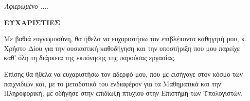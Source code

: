 \pagebreak
\thispagestyle{plain}
\vspace*{\fill}
\begin{flushright}
{\fontsize{14}{14}\selectfont
\textit{Αφιερωμένο ....}
}
\end{flushright}
\vspace*{\fill}

\pagebreak
\thispagestyle{plain}
\begin{center}
{\fontsize{16}{16}\selectfont \underline{\textbf{ΕΥΧΑΡΙΣΤΙΕΣ}}}
\end{center}
\vspace{1cm}

Με βαθιά ευγνωμοσύνη, θα ήθελα να ευχαριστήσω τον επιβλέποντα καθηγητή μου, κ. Χρήστο Δίου για την ουσιαστική καθοδήγηση και την υποστήριξη που μου παρείχε καθ' όλη τη διάρκεια της εκπόνησης της παρούσας εργασίας. 

Επίσης θα ήθελα να ευχαριστήσω τον αδερφό μου, που με εισήγαγε στον κόσμο των παιχνιδιών και, με το μεταδοτικό του ενδιαφέρον για τα Μαθηματικά και την Πληροφορική, με οδήγησε στην επιδίωξη πτυχίου στην Επιστήμη των Υπολογιστών.
\pagebreak
